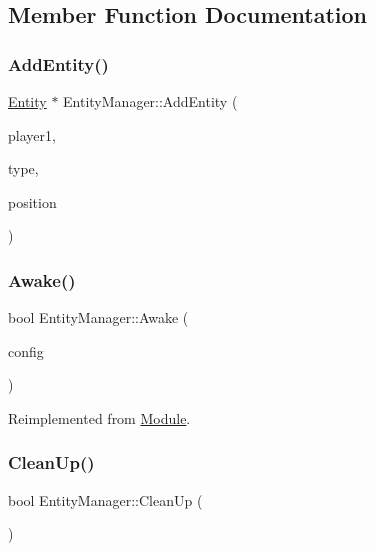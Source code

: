 \subsection{Member Function Documentation}
\mbox{\label{class_entity_manager_a9199d9019f4825766b376db5edc77b94}} 
\subsubsection{\texorpdfstring{AddEntity()}{AddEntity()}}
{\footnotesize\ttfamily \mbox{\hyperlink{class_entity}{Entity}} $\ast$ Entity\+Manager\+::\+Add\+Entity (\begin{DoxyParamCaption}\item[{bool}]{player1,  }\item[{\mbox{\hyperlink{class_entity_afd4a8ca3ac152f193c21d6a5100f1192}{Entity\+::entity\+Type}}}]{type,  }\item[{pair$<$ int, int $>$}]{position }\end{DoxyParamCaption})}

\mbox{\label{class_entity_manager_ada35a7fdb9b3bbaaee41a9451c94c1f9}} 
\subsubsection{\texorpdfstring{Awake()}{Awake()}}
{\footnotesize\ttfamily bool Entity\+Manager\+::\+Awake (\begin{DoxyParamCaption}\item[{pugi\+::xml\+\_\+node \&}]{config }\end{DoxyParamCaption})\hspace{0.3cm}{\ttfamily [virtual]}}



Reimplemented from \mbox{\hyperlink{class_module_a4a283650cf8a73aa0b5599106bc2ba6c}{Module}}.

\mbox{\label{class_entity_manager_abe98672d529a2abf89bba1204338b6c0}} 
\subsubsection{\texorpdfstring{CleanUp()}{CleanUp()}}
{\footnotesize\ttfamily bool Entity\+Manager\+::\+Clean\+Up (\begin{DoxyParamCaption}{ }\end{DoxyParamCaption})\hspace{0.3cm}{\ttfamily [virtual]}}



